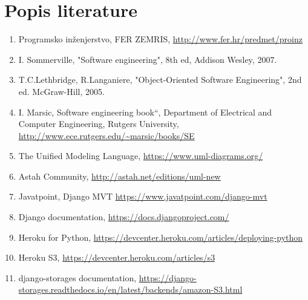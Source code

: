 \chapter*{Popis literature}
		
		\begin{enumerate}
			
			
			\item  Programsko inženjerstvo, FER ZEMRIS, \url{http://www.fer.hr/predmet/proinz}
			
			\item  I. Sommerville, "Software engineering", 8th ed, Addison Wesley, 2007.
			
			\item  T.C.Lethbridge, R.Langaniere, "Object-Oriented Software Engineering", 2nd ed. McGraw-Hill, 2005.
			
			\item  I. Marsic, Software engineering book``, Department of Electrical and Computer Engineering, Rutgers University, \url{http://www.ece.rutgers.edu/~marsic/books/SE}
			
			\item  The Unified Modeling Language, \url{https://www.uml-diagrams.org/}
			
			\item  Astah Community, \url{http://astah.net/editions/uml-new}
			
			\item  Javatpoint, Django MVT \url{https://www.javatpoint.com/django-mvt}
			
			\item  Django documentation, \url{https://docs.djangoproject.com/}
			
			\item  Heroku for Python, \url{https://devcenter.heroku.com/articles/deploying-python}
			
			\item  Heroku S3, \url{https://devcenter.heroku.com/articles/s3}
			
			\item django-storages documentation, \url{https://django-storages.readthedocs.io/en/latest/backends/amazon-S3.html}
		\end{enumerate}
		
		 
